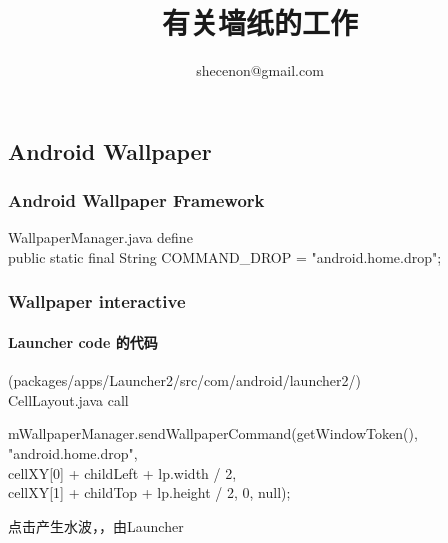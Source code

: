 \documentclass[a4paper,11pt,twoside,openany]{article}%
\title{有关墙纸的工作}
\author{shecenon@gmail.com}
\begin{document}
\begin{CJK}{UTF8}{song}
 \rmfamily
\maketitle
\tableofcontents

\part{Android Wallpaper}
\section{Android Wallpaper Framework}
WallpaperManager.java define\\public static final String COMMAND\_DROP = "android.home.drop";

\section{Wallpaper interactive}

\subsection{Launcher code  的代码 }(packages/apps/Launcher2/src/com/android/launcher2/)\\
CellLayout.java call
\begin{center}
\small
{
mWallpaperManager.sendWallpaperCommand(getWindowToken(), "android.home.drop",\\
\hspace*{70pt}cellXY[0] + childLeft + lp.width / 2,\\
\hspace*{100pt}cellXY[1] + childTop + lp.height / 2, 0, null);\\
}
\end{center}
点击产生水波，，由Launcher


\end{CJK}
\end{document}
